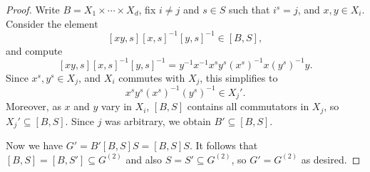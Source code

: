 \documentclass[10pt,a4paper]{amsart}
\begin{document}
\begin{proof}
Write $B=X_1\times \cdots \times X_d$,
fix $i \neq j$ and $s\in S$ such that $i^s=j$, and $x,y\in X_i$.
Consider the element
$$ [xy,s][x,s]^{-1}[y,s]^{-1}\in [B,S] , $$
and compute
$$ [xy,s][x,s]^{-1}[y,s]^{-1} =
y^{-1}x^{-1}x^s y^s (x^s)^{-1}x (y^s)^{-1}y. $$
Since $x^s,y^s\in X_j$, and $X_i$ commutes with $X_j$, this simplifies to
$$ x^s y^s (x^s)^{-1}(y^s)^{-1} \in X_j'. $$
Moreover, as $x$ and $y$ vary in $X_i$, $[B,S]$ contains all commutators in $X_j$, so $X_j' \subseteq [B,S]$. Since $j$ was arbitrary, we obtain $B' \subseteq [B,S]$.

Now we have $G'= B' [B,S] S = [B,S]S$.
It follows that $[B,S] = [B,S'] \subseteq G^{(2)}$ and also $S = S' \subseteq G^{(2)}$, so $G' = G^{(2)}$ as desired.
\end{proof}
\end{document}

